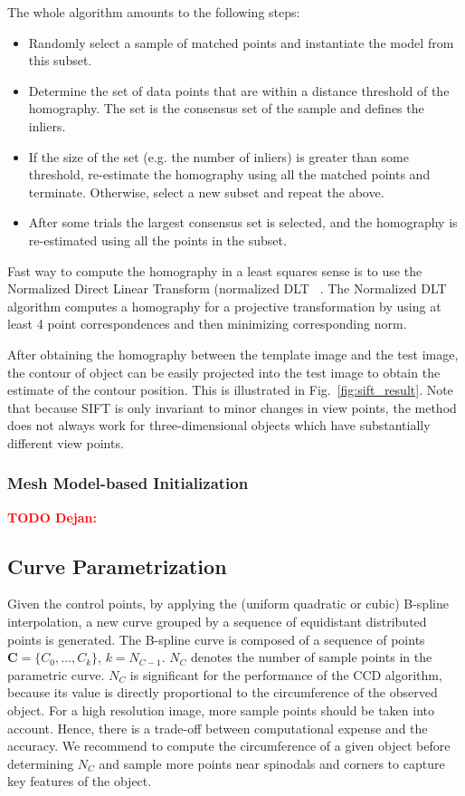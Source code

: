 \documentclass[conference]{IEEEtran}
\newcommand{\todod}[1]{\textbf{\textcolor{red}{TODO Dejan: #1}}}
\begin{document}
The whole algorithm amounts to the following steps: 


\begin{itemize}
\item  Randomly select a sample of matched points and instantiate the
  model from this subset.
\item Determine the set of data points that are within a distance
  threshold of the homography. The set is the consensus set of the sample
  and defines the inliers.
\item If the size of the set (e.g. the number of inliers) is greater
  than some threshold, re-estimate the homography using all the matched
  points and terminate. Otherwise, select a new subset and repeat the
  above.
\item After some trials the largest consensus set is selected, and the
  homography is re-estimated using all the points in the subset.
\end{itemize}
Fast way to compute the homography in a least squares sense is to use the Normalized
Direct Linear Transform (normalized
DLT ~\cite{hartley2003multiple}. The Normalized DLT algorithm computes
a homography for a projective transformation by using at least 4 point
correspondences and then minimizing corresponding norm.

After obtaining the homography between the template image and the
test image, the contour of object can be easily projected
into the test image to obtain the estimate of the contour
position. This is illustrated in Fig.~\ref{fig:sift_result}. Note that because SIFT is only invariant
to minor changes in view points, the method does not always work for
three-dimensional objects which have substantially different view points.

\subsubsection{Mesh Model-based Initialization}
\label{sec:pcl}
\todod{}

\subsection{Curve Parametrization}
Given the control points, by applying the (uniform quadratic or
cubic) B-spline interpolation, a new curve
grouped by a sequence of equidistant distributed points is generated. 
The B-spline curve %
is composed of a sequence of points $\mathbf{C} = \{C_0, \ldots,
C_{k}\}$, $k = N_{C-1}$. $N_C$ denotes the number of sample points in the
parametric curve. $N_C$ is significant for the
performance of the CCD algorithm, because its value is directly
proportional to the circumference of the observed object. For a high
resolution image, more sample points should be taken into account.
Hence, there is a trade-off between computational expense and the
accuracy. We recommend to compute the circumference of a given object before
determining $N_C$ and sample more points near spinodals and corners to
capture key features of the object.
\end{document}
